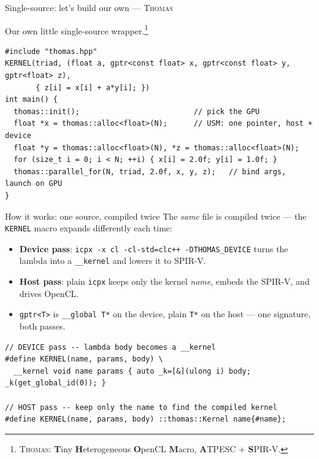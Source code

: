 \begin{frame}[fragile]{Single-source: let's build our own --- \textsc{Thomas}}


Our own little single-source wrapper.\footnote{\textsc{Thomas}: \textbf{T}iny
\textbf{H}eterogeneous \textbf{O}penCL \textbf{M}acro, \textbf{A}TPESC +
\textbf{S}PIR-V.}
\begin{verbatim}
#include "thomas.hpp"
KERNEL(triad, (float a, gptr<const float> x, gptr<const float> y, gptr<float> z),
       { z[i] = x[i] + a*y[i]; })
int main() {
  thomas::init();                          // pick the GPU
  float *x = thomas::alloc<float>(N);      // USM: one pointer, host + device
  float *y = thomas::alloc<float>(N), *z = thomas::alloc<float>(N);
  for (size_t i = 0; i < N; ++i) { x[i] = 2.0f; y[i] = 1.0f; }
  thomas::parallel_for(N, triad, 2.0f, x, y, z);   // bind args, launch on GPU
}
\end{verbatim}
\end{frame}

\begin{frame}[fragile]{How it works: one source, compiled twice}
The \emph{same} file is compiled twice --- the \texttt{KERNEL} macro expands
differently each time:
\begin{itemize}
    \item \textbf{Device pass}: \texttt{icpx -x cl -cl-std=clc++ -DTHOMAS_DEVICE}
          turns the lambda into a \texttt{\_\_kernel} and lowers it to SPIR-V.
    \item \textbf{Host pass}: plain \texttt{icpx} keeps only the kernel
          \emph{name}, embeds the SPIR-V, and drives OpenCL.
    \item \texttt{gptr<T>} is \texttt{\_\_global T*} on the device, plain
          \texttt{T*} on the host --- one signature, both passes.
\end{itemize}
\begin{verbatim}
// DEVICE pass -- lambda body becomes a __kernel
#define KERNEL(name, params, body) \
  __kernel void name params { auto _k=[&](ulong i) body; _k(get_global_id(0)); }

// HOST pass -- keep only the name to find the compiled kernel
#define KERNEL(name, params, body) ::thomas::Kernel name{#name};
\end{verbatim}
\end{frame}



